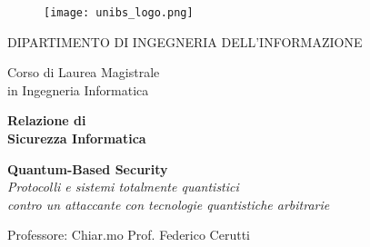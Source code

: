 
\begin{titlepage}
    \begin{center}
        
        \begin{figure}[t]
            \centering
            \texttt{[image: unibs\_logo.png]}    
        \end{figure}

        \vspace*{5mm}
        
        {\fontsize{16}{16}\selectfont
            DIPARTIMENTO DI INGEGNERIA DELL'INFORMAZIONE\\
        }

        \vspace*{6mm}

        {\fontsize{17}{17}\selectfont
            Corso di Laurea Magistrale\\
            in Ingegneria Informatica \\

        }    
        
        \vspace*{20mm}
        
        {\fontsize{20}{20}\selectfont 
            \textbf{Relazione di} \\
            \textbf{Sicurezza Informatica}
        }
        
        \vspace*{5mm}
        
        {\fontsize{20}{20}\selectfont        
            \textbf{Quantum-Based Security} \\
            \textit{Protocolli e sistemi totalmente quantistici} \\
            \textit{contro un attaccante con tecnologie quantistiche arbitrarie} \\
            
        }

    \end{center}

    \vfill

    \begin{flushleft}
        {\fontsize{17}{17}\selectfont 
            Professore: \quad  Chiar.mo Prof. Federico Cerutti
        }
        

\end{flushleft}
\end{titlepage}
